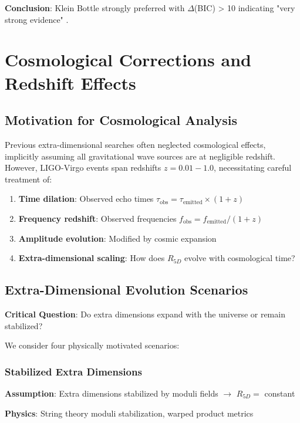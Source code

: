 \documentclass[11pt,a4paper]{article}
\begin{document}
\textbf{Conclusion}: Klein Bottle strongly preferred with $\Delta$(BIC) > 10 indicating "very strong evidence" \cite{kass1995}.

\section{Cosmological Corrections and Redshift Effects}

\subsection{Motivation for Cosmological Analysis}

Previous extra-dimensional searches often neglected cosmological effects, implicitly assuming all gravitational wave sources are at negligible redshift. However, LIGO-Virgo events span redshifts $z = 0.01-1.0$, necessitating careful treatment of:

\begin{enumerate}
    \item \textbf{Time dilation}: Observed echo times $\tau_{\text{obs}} = \tau_{\text{emitted}} \times (1+z)$
    \item \textbf{Frequency redshift}: Observed frequencies $f_{\text{obs}} = f_{\text{emitted}} / (1+z)$
    \item \textbf{Amplitude evolution}: Modified by cosmic expansion
    \item \textbf{Extra-dimensional scaling}: How does $R_{5D}$ evolve with cosmological time?
\end{enumerate}

\subsection{Extra-Dimensional Evolution Scenarios}

\textbf{Critical Question}: Do extra dimensions expand with the universe or remain stabilized?

We consider four physically motivated scenarios:

\subsubsection{Stabilized Extra Dimensions}

\textbf{Assumption}: Extra dimensions stabilized by moduli fields $\to$ $R_{5D} = $ constant

\textbf{Physics}: String theory moduli stabilization, warped product metrics
\end{document}
